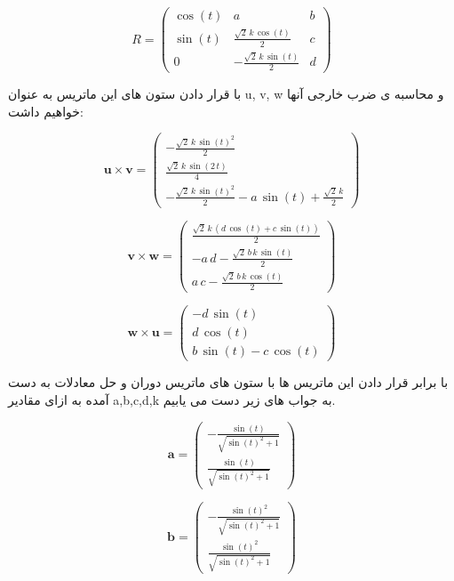 \[
R = \left(
\begin{array}{ccc}
	\cos \left(t\right) & a & b \\
	\sin \left(t\right) & \frac{\sqrt{2}\,k\,\cos \left(t\right)}{2} & c \\
	0 & -\frac{\sqrt{2}\,k\,\sin \left(t\right)}{2} & d
\end{array}
\right)
\]

با قرار دادن ستون های این ماتریس به عنوان u, v, w و محاسبه ی ضرب خارجی آنها خواهیم داشت:

\[
\mathbf{u} \times \mathbf{v} = \left(
\begin{array}{c} 
	-\frac{\sqrt{2}\,k\,{\sin \left(t\right)}^2 }{2} \\
	\frac{\sqrt{2}\,k\,\sin \left(2\,t\right)}{4} \\
	-\frac{\sqrt{2}\,k\,{\sin \left(t\right)}^2 }{2} - a\,\sin \left(t\right) + \frac{\sqrt{2}\,k}{2}
\end{array}
\right)
\]

\[
\mathbf{v} \times \mathbf{w} = \left(
\begin{array}{c}
	\frac{\sqrt{2}\,k\,\left(d\,\cos \left(t\right) + c\,\sin \left(t\right)\right)}{2} \\
	-a\,d - \frac{\sqrt{2}\,b\,k\,\sin \left(t\right)}{2} \\
	a\,c - \frac{\sqrt{2}\,b\,k\,\cos \left(t\right)}{2}
\end{array}
\right)
\]

\[
\mathbf{w} \times \mathbf{u} = \left(
\begin{array}{c}
	-d\,\sin \left(t\right) \\
	d\,\cos \left(t\right) \\
	b\,\sin \left(t\right) - c\,\cos \left(t\right)
\end{array}
\right)
\]

با برابر قرار دادن این ماتریس ها با ستون های ماتریس دوران و حل معادلات به دست آمده به ازای مقادیر a,b,c,d,k به جواب های زیر دست می یابیم.

\[
\mathbf{a} = \left(
\begin{array}{c}
	-\frac{\sin \left(t\right)}{\sqrt{{\sin \left(t\right)}^2 + 1}} \\
	\frac{\sin \left(t\right)}{\sqrt{{\sin \left(t\right)}^2 + 1}}
\end{array}
\right)
\]

\[
\mathbf{b} = \left(
\begin{array}{c}
	-\frac{{\sin \left(t\right)}^2}{\sqrt{{\sin \left(t\right)}^2 + 1}} \\
	\frac{{\sin \left(t\right)}^2}{\sqrt{{\sin \left(t\right)}^2 + 1}}
\end{array}
\right)
\]

